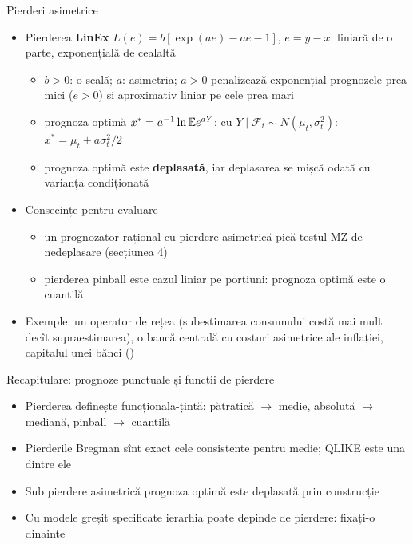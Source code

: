 \begin{frame}{Pierderi asimetrice}
\itemsize{\small}
\begin{itemize}
    \item Pierderea \textbf{LinEx} $L(e) = b[\exp(ae) - ae - 1]$, $e = y - x$: liniară de o parte, exponențială de cealaltă
    \begin{itemize}
        \item $b > 0$: o scală; $a$: asimetria; $a > 0$ penalizează exponențial prognozele prea mici ($e > 0$) și aproximativ liniar pe cele prea mari
        \item prognoza optimă $x^* = a^{-1}\ln\mathbb{E} e^{aY}$; cu $Y \mid \mathcal F_t \sim N(\mu_t, \sigma_t^2)$: $x^* = \mu_t + a\sigma^2_t/2$ 
        \item prognoza optimă este \textbf{deplasată}, iar deplasarea se mișcă odată cu varianța condiționată
    \end{itemize}
    \item Consecințe pentru evaluare
    \begin{itemize}
        \item un prognozator rațional cu pierdere asimetrică pică testul MZ de nedeplasare (secțiunea 4)
        \item pierderea pinball este cazul liniar pe porțiuni: prognoza optimă este o cuantilă
    \end{itemize}
    \item Exemple: un operator de rețea (subestimarea consumului costă mai mult decît supraestimarea), o bancă centrală cu costuri asimetrice ale inflației, capitalul unei bănci ()
\end{itemize}
\end{frame}

\begin{frame}{Recapitulare: prognoze punctuale și funcții de pierdere}
\itemsize{\small}
\begin{itemize}
    \item Pierderea definește funcționala-țintă: pătratică $\to$ medie, absolută $\to$ mediană, pinball $\to$ cuantilă
    \item Pierderile Bregman sînt exact cele consistente pentru medie; QLIKE este una dintre ele
    \item Sub pierdere asimetrică prognoza optimă este deplasată prin construcție
    \item Cu modele greșit specificate ierarhia poate depinde de pierdere: fixați-o dinainte
\end{itemize}
\end{frame}



